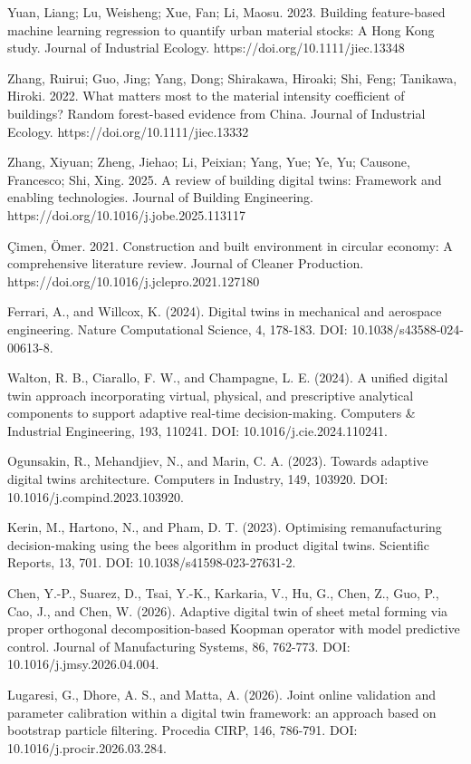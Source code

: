 Yuan, Liang; Lu, Weisheng; Xue, Fan; Li, Maosu. 2023. Building feature-based machine learning regression to quantify urban material stocks: A Hong Kong study. Journal of Industrial Ecology. https://doi.org/10.1111/jiec.13348

Zhang, Ruirui; Guo, Jing; Yang, Dong; Shirakawa, Hiroaki; Shi, Feng; Tanikawa, Hiroki. 2022. What matters most to the material intensity coefficient of buildings? Random forest-based evidence from China. Journal of Industrial Ecology. https://doi.org/10.1111/jiec.13332

Zhang, Xiyuan; Zheng, Jiehao; Li, Peixian; Yang, Yue; Ye, Yu; Causone, Francesco; Shi, Xing. 2025. A review of building digital twins: Framework and enabling technologies. Journal of Building Engineering. https://doi.org/10.1016/j.jobe.2025.113117

Çimen, Ömer. 2021. Construction and built environment in circular economy: A comprehensive literature review. Journal of Cleaner Production. https://doi.org/10.1016/j.jclepro.2021.127180

Ferrari, A., and Willcox, K. (2024). Digital twins in mechanical and aerospace engineering. Nature Computational Science, 4, 178-183. DOI: 10.1038/s43588-024-00613-8.

Walton, R. B., Ciarallo, F. W., and Champagne, L. E. (2024). A unified digital twin approach incorporating virtual, physical, and prescriptive analytical components to support adaptive real-time decision-making. Computers \& Industrial Engineering, 193, 110241. DOI: 10.1016/j.cie.2024.110241.

Ogunsakin, R., Mehandjiev, N., and Marin, C. A. (2023). Towards adaptive digital twins architecture. Computers in Industry, 149, 103920. DOI: 10.1016/j.compind.2023.103920.

Kerin, M., Hartono, N., and Pham, D. T. (2023). Optimising remanufacturing decision-making using the bees algorithm in product digital twins. Scientific Reports, 13, 701. DOI: 10.1038/s41598-023-27631-2.

Chen, Y.-P., Suarez, D., Tsai, Y.-K., Karkaria, V., Hu, G., Chen, Z., Guo, P., Cao, J., and Chen, W. (2026). Adaptive digital twin of sheet metal forming via proper orthogonal decomposition-based Koopman operator with model predictive control. Journal of Manufacturing Systems, 86, 762-773. DOI: 10.1016/j.jmsy.2026.04.004.

Lugaresi, G., Dhore, A. S., and Matta, A. (2026). Joint online validation and parameter calibration within a digital twin framework: an approach based on bootstrap particle filtering. Procedia CIRP, 146, 786-791. DOI: 10.1016/j.procir.2026.03.284.

